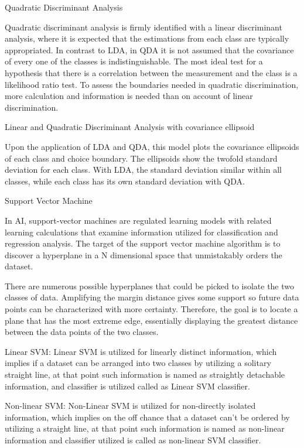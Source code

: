 \documentclass[a4paper,12pt]{report}
\begin{document}
Quadratic Discriminant Analysis
 
Quadratic discriminant analysis is firmly identified with a linear discriminant analysis, where it is expected that the estimations from each class are typically appropriated. In contrast to LDA, in QDA it is not assumed that the covariance of every one of the classes is indistinguishable. The most ideal test for a hypothesis that there is a correlation between the measurement and the class is a likelihood ratio test. To assess the boundaries needed in quadratic discrimination, more calculation and information is needed than on account of linear discrimination.

Linear and Quadratic Discriminant Analysis with covariance ellipsoid




Upon the application of LDA and QDA, this model plots the covariance ellipsoids of each class and choice boundary. The ellipsoids show the twofold standard deviation for each class. With LDA, the standard deviation similar within all classes, while each class has its own standard deviation with QDA.

Support Vector Machine
 
In AI, support-vector machines are regulated learning models with related learning calculations that examine information utilized for classification and regression analysis. The target of the support vector machine algorithm is to discover a hyperplane in a N dimensional space that unmistakably orders the dataset.


There are numerous possible hyperplanes that could be picked to isolate the two classes of data. Amplifying the margin distance gives some support so future data points can be characterized with more certainty. Therefore, the goal is to locate a plane that has the most extreme edge, essentially displaying the greatest distance between the data points of the two classes.








Linear SVM: Linear SVM is utilized for linearly distinct information, which implies if a dataset can be arranged into two classes by utilizing a solitary straight line, at that point such information is named as straightly detachable information, and classifier is utilized called as Linear SVM classifier.



Non-linear SVM: Non-Linear SVM is utilized for non-directly isolated information, which implies on the off chance that a dataset can't be ordered by utilizing a straight line, at that point such information is named as non-linear information and classifier utilized is called as non-linear SVM classifier.
\end{document}
